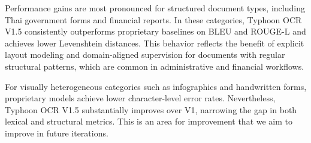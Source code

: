 \documentclass[]{typhoon} %
\begin{document}
Performance gains are most pronounced for structured document types, including Thai government forms and financial reports. In these categories, Typhoon OCR V1.5 consistently outperforms proprietary baselines on BLEU and ROUGE-L and achieves lower Levenshtein distances. This behavior reflects the benefit of explicit layout modeling and domain-aligned supervision for documents with regular structural patterns, which are common in administrative and financial workflows.

For visually heterogeneous categories such as infographics and handwritten forms, proprietary models achieve lower character-level error rates. Nevertheless, Typhoon OCR V1.5 substantially improves over V1, narrowing the gap in both lexical and structural metrics. This is an area for improvement that we aim to improve in future iterations.





\end{document}
